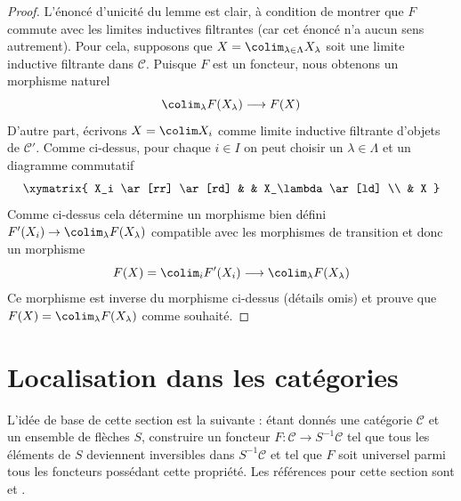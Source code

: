\begin{proof}
\medskip\noindent
L'énoncé d'unicité du lemme est clair, à condition de montrer que
$F$ commute avec les limites inductives filtrantes (car cet énoncé n'a
aucun sens autrement). Pour cela, supposons que $X = \colim_{\lambda \in \Lambda} X_\lambda$ soit une limite inductive filtrante dans $\mathcal{C}$. Puisque
$F$ est un foncteur, nous obtenons un morphisme naturel
$$
\colim_\lambda F(X_\lambda) \longrightarrow F(X)
$$
D'autre part, écrivons $X = \colim X_i$ comme limite inductive filtrante d'objets de
$\mathcal{C}'$. Comme ci-dessus, pour chaque $i \in I$ on peut choisir un
$\lambda \in \Lambda$ et un diagramme commutatif
$$
\xymatrix{
X_i \ar[rr] \ar[rd] & & X_\lambda \ar[ld] \\
& X
}
$$
Comme ci-dessus cela détermine un morphisme bien défini $F'(X_i) \to \colim_\lambda F(X_\lambda)$ compatible avec les morphismes de transition et
donc un morphisme
$$
F(X) = \colim_i F'(X_i) \longrightarrow \colim_\lambda F(X_\lambda)
$$
Ce morphisme est inverse du morphisme ci-dessus (détails omis) et prouve que
$F(X) = \colim_\lambda F(X_\lambda)$ comme souhaité.
\end{proof}







\section{Localisation dans les catégories}
\label{section-localization}

\noindent
L'idée de base de cette section est la suivante : étant donnés une catégorie $\mathcal{C}$ et
un ensemble de flèches $S$, construire un foncteur $F : \mathcal{C} \to S^{-1}\mathcal{C}$ tel que tous les éléments de $S$ deviennent inversibles
dans $S^{-1}\mathcal{C}$ et tel que $F$ soit universel parmi tous les foncteurs
possédant cette propriété. Les références pour cette section sont
\cite[Chapter I, Section 2]{GZ} et \cite[Chapter II, Section 2]{Verdier}.

